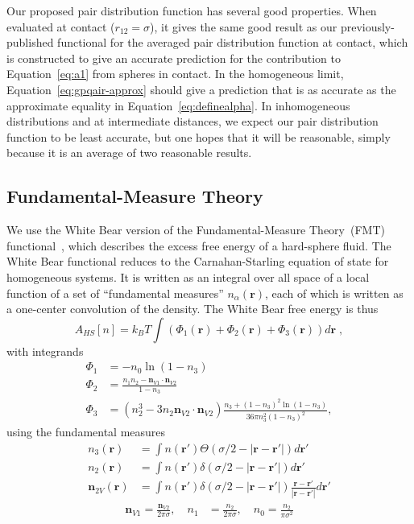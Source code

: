 \documentclass[letterpaper,twocolumn,amsmath,amssymb,pre]{revtex4-1}
\newcommand{\rr}{\textbf{r}}
\begin{document}
Our proposed pair distribution function has several good properties.
When evaluated at contact ($r_{12}=\sigma$), it gives the same good
result as our previously-published functional for the averaged pair
distribution function at contact, which is constructed to give an
accurate prediction for the contribution to Equation~\ref{eq:a1} from
spheres in contact.  In the homogeneous limit,
Equation~\ref{eq:gpqair-approx} should give a prediction that is as
accurate as the approximate equality in
Equation~\ref{eq:definealpha}.  In inhomogeneous distributions and at
intermediate distances, we expect our pair distribution function to be
least accurate, but one hopes that it will be reasonable, simply
because it is an average of two reasonable results.


\subsection*{Fundamental-Measure Theory}

We use the White Bear version of the Fundamental-Measure Theory~(FMT)
functional~\cite{roth2002whitebear}, which describes the excess free
energy of a hard-sphere fluid.  The White Bear functional reduces to
the Carnahan-Starling equation of state for homogeneous systems.  It
is written as an integral over all space of a local function of a set
of ``fundamental measures'' $n_\alpha(\rr)$, each of which is written
as a one-center convolution of the density.  The White Bear free
energy is thus
\begin{equation}
A_{\textit{HS}}[n] = k_B T \int \left(\Phi_1(\rr) + \Phi_2(\rr) + \Phi_3(\rr)\right) d\rr \; ,
\end{equation}
with integrands
\begin{align}
\Phi_1 &= -n_0 \ln\left( 1 - n_3\right) \label{eq:Phi1}\\
\Phi_2 &= \frac{n_1 n_2 - \mathbf{n}_{V1} \cdot\mathbf{n}_{V2}}{1-n_3} \\
\Phi_3 &= (n_2^3 - 3 n_2 \mathbf{n}_{V2} \cdot \mathbf{n}_{V2}) \frac{
  n_3 + (1-n_3)^2 \ln(1-n_3)
}{
  36\pi n_3^2\left( 1 - n_3 \right)^2
} , \label{eq:Phi3}
\end{align}
using the fundamental measures
\begin{align}
  n_3(\rr) &= \int n(\rr') \Theta(\sigma/2 -\left|\rr - \rr'\right|)
  d\rr' \label{eq:FMn3} \\
  n_2(\rr) &= \int n(\rr') \delta(\sigma/2 -\left|\rr - \rr'\right|) d\rr' \\
  \mathbf{n}_{2V}(\rr) &= \int n(\rr') \delta(\sigma/2 -\left|\rr - \rr'\right|) \frac{\rr-\rr'}{|\rr-\rr'|}d\rr'
\end{align}
\begin{align}
  \mathbf{n}_{V1} = \frac{\mathbf{n}_{V2}}{2\pi \sigma}, \quad
  n_1 &= \frac{n_2}{2\pi \sigma} , \quad
  n_0 = \frac{n_2}{\pi \sigma^2} \label{eq:FMrest}
\end{align}
\end{document}
